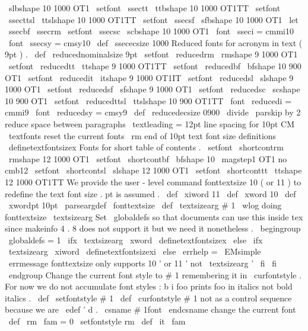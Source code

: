 {{{{\
slbshape
{
10
}
{
1000
}
{
OT1
}
\
setfont
\
ssectt
\
ttbshape
{
10
}
{
1000
}
{
OT1TT
}
\
setfont
\
ssecttsl
\
ttslshape
{
10
}
{
1000
}
{
OT1TT
}
\
setfont
\
ssecsf
\
sfbshape
{
10
}
{
1000
}
{
OT1
}
\
let
\
ssecbf
\
ssecrm
\
setfont
\
ssecsc
\
scbshape
{
10
}
{
1000
}
{
OT1
}
\
font
\
sseci
=
cmmi10
\
font
\
ssecsy
=
cmsy10
\
def
\
ssececsize
{
1000
}
%
Reduced
fonts
for
acronym
in
text
(
9pt
)
.
\
def
\
reducednominalsize
{
9pt
}
\
setfont
\
reducedrm
\
rmshape
{
9
}
{
1000
}
{
OT1
}
\
setfont
\
reducedtt
\
ttshape
{
9
}
{
1000
}
{
OT1TT
}
\
setfont
\
reducedbf
\
bfshape
{
10
}
{
900
}
{
OT1
}
\
setfont
\
reducedit
\
itshape
{
9
}
{
1000
}
{
OT1IT
}
\
setfont
\
reducedsl
\
slshape
{
9
}
{
1000
}
{
OT1
}
\
setfont
\
reducedsf
\
sfshape
{
9
}
{
1000
}
{
OT1
}
\
setfont
\
reducedsc
\
scshape
{
10
}
{
900
}
{
OT1
}
\
setfont
\
reducedttsl
\
ttslshape
{
10
}
{
900
}
{
OT1TT
}
\
font
\
reducedi
=
cmmi9
\
font
\
reducedsy
=
cmsy9
\
def
\
reducedecsize
{
0900
}
\
divide
\
parskip
by
2
%
reduce
space
between
paragraphs
\
textleading
=
12pt
%
line
spacing
for
10pt
CM
\
textfonts
%
reset
the
current
fonts
\
rm
}
%
end
of
10pt
text
font
size
definitions
\
definetextfontsizex
%
Fonts
for
short
table
of
contents
.
\
setfont
\
shortcontrm
\
rmshape
{
12
}
{
1000
}
{
OT1
}
\
setfont
\
shortcontbf
\
bfshape
{
10
}
{
\
magstep1
}
{
OT1
}
%
no
cmb12
\
setfont
\
shortcontsl
\
slshape
{
12
}
{
1000
}
{
OT1
}
\
setfont
\
shortconttt
\
ttshape
{
12
}
{
1000
}
{
OT1TT
}
%
We
provide
the
user
-
level
command
%
fonttextsize
10
%
(
or
11
)
to
redefine
the
text
font
size
.
pt
is
assumed
.
%
\
def
\
xiword
{
11
}
\
def
\
xword
{
10
}
\
def
\
xwordpt
{
10pt
}
%
\
parseargdef
\
fonttextsize
{
%
\
def
\
textsizearg
{
#
1
}
%
%
\
wlog
{
doing
fonttextsize
\
textsizearg
}
%
%
%
Set
\
globaldefs
so
that
documents
can
use
this
inside
tex
since
%
makeinfo
4
.
8
does
not
support
it
but
we
need
it
nonetheless
.
%
\
begingroup
\
globaldefs
=
1
\
ifx
\
textsizearg
\
xword
\
definetextfontsizex
\
else
\
ifx
\
textsizearg
\
xiword
\
definetextfontsizexi
\
else
\
errhelp
=
\
EMsimple
\
errmessage
{
fonttextsize
only
supports
10
'
or
11
'
not
\
textsizearg
'
}
\
fi
\
fi
\
endgroup
}
%
%
Change
the
current
font
style
to
#
1
remembering
it
in
\
curfontstyle
.
%
For
now
we
do
not
accumulate
font
styles
:
b
{
i
{
foo
}
}
prints
foo
in
%
italics
not
bold
italics
.
%
\
def
\
setfontstyle
#
1
{
%
\
def
\
curfontstyle
{
#
1
}
%
not
as
a
control
sequence
because
we
are
\
edef
'
d
.
\
csname
#
1font
\
endcsname
%
change
the
current
font
}
\
def
\
rm
{
\
fam
=
0
\
setfontstyle
{
rm
}
}
\
def
\
it
{
\
fam
}}}}
